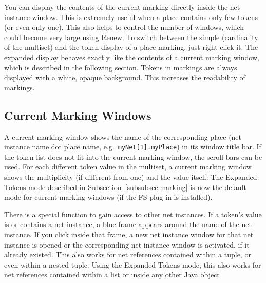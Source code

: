 You can display the contents of the current marking directly
inside the net instance window.
This is extremely useful when a place
contains only few tokens (or even only one). This also helps
to control the number of windows, which could become very
large using Renew.
To switch between the simple (cardinality of the
multiset) and the token display of a place marking, just
right-click it.
The expanded display behaves exactly like the contents of a
current marking window, which is described in the following
section.
Tokens in markings are always displayed with a white, opaque
background.
This increases the readability of markings.  


\subsection{Current Marking Windows}

A current marking window shows the name of the corresponding place
(net instance name dot place name, e.g.\ \texttt{myNet[1].myPlace})
in its window title bar.
If the token list does not fit into the current marking window,
the scroll bars can be used.
For each different token value in the multiset, a current marking
window shows the multiplicity (if different from one) and
the value itself.
The Expanded Tokens mode described in
Subsection~\ref{subsubsec:marking} is now the default mode for
current marking windows (if the FS plug-in is installed).

There is a special function to gain access to other net instances.
If a token's value is or contains a net instance, a blue frame appears
around the name of the net instance.
If you click inside that frame, a new net instance window for
that net instance is opened or the corresponding net instance
window is activated, if it already existed.
This also works for net references contained within
a tuple, or even within a nested tuple.
Using the Expanded Tokens mode, this also works for net references
contained within a list or inside any other Java object



